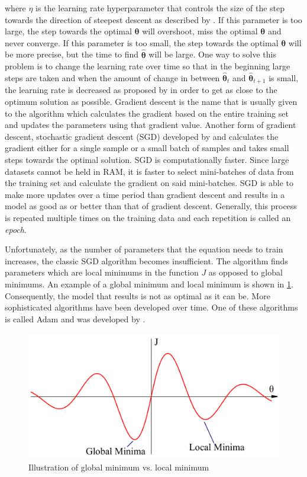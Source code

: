 \noindent
where $\eta$ is the learning rate hyperparameter that controls the size of the step towards the direction of steepest descent as described by \citet{gd_explanation}. If this parameter is too large, the step towards the optimal $\boldsymbol{\theta}$ will overshoot, miss the optimal $\boldsymbol{\theta}$ and never converge. If this parameter is too small, the step towards the optimal $\boldsymbol{\theta}$ will be more precise, but the time to find $\boldsymbol{\hat{\theta}}$ will be large. One way to solve this problem is to change the learning rate over time so that in the beginning large steps are taken and when the amount of change in between $\boldsymbol{\hat{\theta}}_{t}$ and $\boldsymbol{\hat{\theta}}_{t+1}$ is small, the learning rate is decreased as proposed by \citet{decreasing_learning_rate} in order to get as close to the optimum solution as possible. Gradient descent is the name that is usually given to the algorithm which calculates the gradient based on the entire training set and updates the parameters using that gradient value. Another form of gradient descent, stochastic gradient descent (SGD) developed by \citet{sgd1} and \citet{sgd2}  calculates the gradient either for a single sample or a small batch of samples and takes small steps towards the optimal solution. SGD is computationally faster. Since large datasets cannot be held in RAM, it is faster to select mini-batches of data from the training set and calculate the gradient on said mini-batches. SGD is able to make more updates over a time period than gradient descent and results in a model as good as or better than that of gradient descent. Generally, this process is repeated multiple times on the training data and each repetition is called an \textit{epoch}.

Unfortunately, as the number of parameters that the equation needs to train increases, the classic SGD algorithm becomes insufficient. The algorithm finds parameters which are local minimums in the function $J$ as opposed to global minimums. An example of a global minimum and local minimum is shown in \cref{fig:minmax}. Consequently, the model that results is not as optimal as it can be. More sophisticated algorithms have been developed over time. One of these algorithms is called Adam and was developed by \citet{kingma2014adam}. 

\begin{figure}[!ht]
	\centering
	\includegraphics[width=0.45\linewidth]{pictures/minmax.pdf}
	\caption{Illustration of global minimum vs. local minimum}\label{fig:minmax}  
\end{figure}


